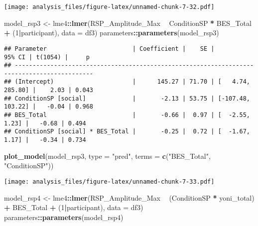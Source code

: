 \documentclass[
]{article}
\newenvironment{Shaded}{\begin{snugshade}}{\end{snugshade}}
\newcommand{\DataTypeTok}[1]{\textcolor[rgb]{0.13,0.29,0.53}{#1}}
\newcommand{\DecValTok}[1]{\textcolor[rgb]{0.00,0.00,0.81}{#1}}
\newcommand{\KeywordTok}[1]{\textcolor[rgb]{0.13,0.29,0.53}{\textbf{#1}}}
\newcommand{\NormalTok}[1]{#1}
\newcommand{\OperatorTok}[1]{\textcolor[rgb]{0.81,0.36,0.00}{\textbf{#1}}}
\newcommand{\StringTok}[1]{\textcolor[rgb]{0.31,0.60,0.02}{#1}}
\begin{document}
\texttt{[image: analysis\_files/figure-latex/unnamed-chunk-7-32.pdf]}

\begin{Shaded}
\begin{Highlighting}[]
\NormalTok{model_rsp3 <-}\StringTok{ }\NormalTok{lme4}\OperatorTok{::}\KeywordTok{lmer}\NormalTok{(RSP_Amplitude_Max }\OperatorTok{~}\StringTok{ }\NormalTok{ConditionSP }\OperatorTok{*}\StringTok{ }\NormalTok{BES_Total }\OperatorTok{+}\StringTok{ }\NormalTok{(}\DecValTok{1}\OperatorTok{|}\NormalTok{participant), }\DataTypeTok{data =}\NormalTok{ df3)}
\NormalTok{parameters}\OperatorTok{::}\KeywordTok{parameters}\NormalTok{(model_rsp3)}
\end{Highlighting}
\end{Shaded}

\begin{verbatim}
## Parameter                        | Coefficient |    SE |            95% CI | t(1054) |     p
## --------------------------------------------------------------------------------------------
## (Intercept)                      |      145.27 | 71.70 | [   4.74, 285.80] |    2.03 | 0.043
## ConditionSP [social]             |       -2.13 | 53.75 | [-107.48, 103.22] |   -0.04 | 0.968
## BES_Total                        |       -0.66 |  0.97 | [  -2.55,   1.23] |   -0.68 | 0.494
## ConditionSP [social] * BES_Total |       -0.25 |  0.72 | [  -1.67,   1.17] |   -0.34 | 0.734
\end{verbatim}

\begin{Shaded}
\begin{Highlighting}[]
\KeywordTok{plot_model}\NormalTok{(model_rsp3, }\DataTypeTok{type =} \StringTok{"pred"}\NormalTok{, }\DataTypeTok{terms =} \KeywordTok{c}\NormalTok{(}\StringTok{"BES_Total"}\NormalTok{, }\StringTok{"ConditionSP"}\NormalTok{))}
\end{Highlighting}
\end{Shaded}

\texttt{[image: analysis\_files/figure-latex/unnamed-chunk-7-33.pdf]}

\begin{Shaded}
\begin{Highlighting}[]
\NormalTok{model_rsp4 <-}\StringTok{ }\NormalTok{lme4}\OperatorTok{::}\KeywordTok{lmer}\NormalTok{(RSP_Amplitude_Max }\OperatorTok{~}\StringTok{ }\NormalTok{(ConditionSP }\OperatorTok{*}\StringTok{ }\NormalTok{yoni_total) }\OperatorTok{+}\StringTok{ }\NormalTok{BES_Total }\OperatorTok{+}\StringTok{ }\NormalTok{(}\DecValTok{1}\OperatorTok{|}\NormalTok{participant), }\DataTypeTok{data =}\NormalTok{ df3)}
\NormalTok{parameters}\OperatorTok{::}\KeywordTok{parameters}\NormalTok{(model_rsp4)}
\end{Highlighting}
\end{Shaded}
\end{document}
